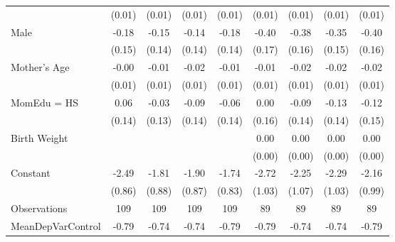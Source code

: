 {\begin{tabular}{l*{8}{c}}
                    &      (0.01)         &      (0.01)         &      (0.01)         &      (0.01)         &      (0.01)         &      (0.01)         &      (0.01)         &      (0.01)         \\
[1em]
Male                &       -0.18         &       -0.15         &       -0.14         &       -0.18         &       -0.40\sym{**} &       -0.38\sym{**} &       -0.35\sym{**} &       -0.40\sym{**} \\
                    &      (0.15)         &      (0.14)         &      (0.14)         &      (0.14)         &      (0.17)         &      (0.16)         &      (0.15)         &      (0.16)         \\
[1em]
Mother's Age        &       -0.00         &       -0.01         &       -0.02         &       -0.01         &       -0.01         &       -0.02         &       -0.02\sym{*}  &       -0.02         \\
                    &      (0.01)         &      (0.01)         &      (0.01)         &      (0.01)         &      (0.01)         &      (0.01)         &      (0.01)         &      (0.01)         \\
[1em]
MomEdu = HS         &        0.06         &       -0.03         &       -0.09         &       -0.06         &        0.00         &       -0.09         &       -0.13         &       -0.12         \\
                    &      (0.14)         &      (0.13)         &      (0.14)         &      (0.14)         &      (0.16)         &      (0.14)         &      (0.14)         &      (0.15)         \\
[1em]
Birth Weight        &                     &                     &                     &                     &        0.00\sym{*}  &        0.00\sym{*}  &        0.00         &        0.00         \\
                    &                     &                     &                     &                     &      (0.00)         &      (0.00)         &      (0.00)         &      (0.00)         \\
[1em]
Constant            &       -2.49\sym{***}&       -1.81\sym{**} &       -1.90\sym{**} &       -1.74\sym{**} &       -2.72\sym{***}&       -2.25\sym{**} &       -2.29\sym{**} &       -2.16\sym{**} \\
                    &      (0.86)         &      (0.88)         &      (0.87)         &      (0.83)         &      (1.03)         &      (1.07)         &      (1.03)         &      (0.99)         \\
\hline
Observations        &         109         &         109         &         109         &         109         &          89         &          89         &          89         &          89         \\
MeanDepVarControl   &       -0.79         &       -0.74         &       -0.74         &       -0.79         &       -0.79         &       -0.74         &       -0.74         &       -0.79         \\
\hline\hline
\end{tabular}
}
